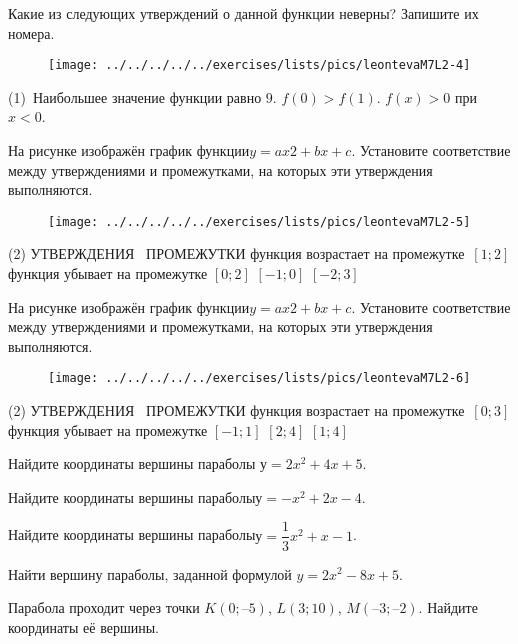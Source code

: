 \begin{class}[number=1]
\begin{listofex}
	Какие из следующих утверждений о данной функции неверны? Запишите их номера.
	\begin{figure}[h!]
		\centering
		\texttt{[image: ../../../../../exercises/lists/pics/leontevaM7L2-4]}
	\end{figure}
	\begin{tasks}(1)
		\task  Наибольшее значение функции равно \( 9 \).
		\task \( f(0)>f(1) \).
		\task \( f( x )>0 \) при \( x<0 \).
	\end{tasks}
	\newpage
	\item На рисунке изображён график функции\(  y = ax2 + bx + c \). Установите соответствие между утверждениями и промежутками, на которых эти утверждения выполняются. 
	\begin{figure}[h!]
		\centering
		\texttt{[image: ../../../../../exercises/lists/pics/leontevaM7L2-5]}
	\end{figure}
	\begin{tasks}(2)
		\task[] УТВЕРЖДЕНИЯ	 
		\task[]	ПРОМЕЖУТКИ
		\task[A)] функция возрастает на промежутке
		\task \( [1;2] \)
		\task[B)]функция убывает на промежутке
		\task \( [0;2] \)
		\task[]
		\task\( [-1;0] \)
		\task[]
		\task\( [-2;3] \)
	\end{tasks}
	\newpage
	\item 
	На рисунке изображён график функции\(  y = ax2 + bx + c \). Установите соответствие между утверждениями и промежутками, на которых эти утверждения выполняются. 
	\begin{figure}[h!]
		\centering
		\texttt{[image: ../../../../../exercises/lists/pics/leontevaM7L2-6]}
	\end{figure}
	\begin{tasks}(2)
		\task[] УТВЕРЖДЕНИЯ	 
		\task[]	ПРОМЕЖУТКИ
		\task[A)] функция возрастает на промежутке
		\task \( [0; 3] \)
		\task[B)]функция убывает на промежутке
		\task \( [-1; 1] \)
		\task[]
		\task\( [2; 4] \)
		\task[]
		\task\( [1; 4] \)
	\end{tasks}
	\item Найдите координаты вершины параболы \( у = 2x^{2} + 4x + 5 \).
	\item Найдите координаты вершины параболы\(  у = -x^{2} + 2x - 4 \).
	\item Найдите координаты вершины параболы\(  у = \dfrac{1}{3}x^{2}+x-1 \).
	\item Найти вершину параболы, заданной формулой \( y=2x^{2} - 8x + 5. \)
	\item Парабола проходит через точки \( K(0; –5) \), \( L(3; 10) \), \(  M( –3; –2) \). Найдите координаты её вершины.

\end{listofex}
\end{class}
